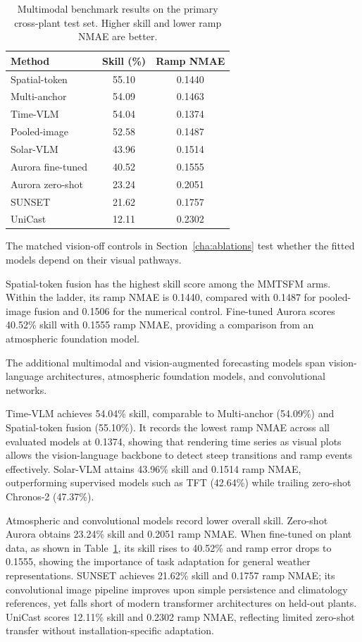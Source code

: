 \begin{table}[htbp]\centering
\begin{tabular}{lcc}\hline
Method & Skill (\%) & Ramp NMAE \\\hline
Spatial-token & 55.10 & 0.1440 \\
Multi-anchor & 54.09 & 0.1463 \\
Time-VLM~\cite{timevlm} & 54.04 & 0.1374 \\
Pooled-image & 52.58 & 0.1487 \\
Solar-VLM~\cite{solarvlm} & 43.96 & 0.1514 \\
Aurora fine-tuned~\cite{aurora} & 40.52 & 0.1555 \\
Aurora zero-shot~\cite{aurora} & 23.24 & 0.2051 \\
SUNSET~\cite{sunset} & 21.62 & 0.1757 \\
UniCast~\cite{unicast} & 12.11 & 0.2302 \\\hline
\end{tabular}
\caption{Multimodal benchmark results on the primary cross-plant test set. Higher skill and lower ramp NMAE are better.}\label{tab:results-multimodal}
\end{table}

The matched vision-off controls in Section~\ref{cha:ablations} test whether the fitted models depend on their visual pathways.

Spatial-token fusion has the highest skill score among the MMTSFM arms. Within the ladder, its ramp NMAE is 0.1440, compared with 0.1487 for pooled-image fusion and 0.1506 for the numerical control. Fine-tuned Aurora scores 40.52\% skill with 0.1555 ramp NMAE, providing a comparison from an atmospheric foundation model.

The additional multimodal and vision-augmented forecasting models span vision-language architectures, atmospheric foundation models, and convolutional networks.

Time-VLM achieves 54.04\% skill, comparable to Multi-anchor (54.09\%) and Spatial-token fusion (55.10\%). It records the lowest ramp NMAE across all evaluated models at 0.1374, showing that rendering time series as visual plots allows the vision-language backbone to detect steep transitions and ramp events effectively. Solar-VLM attains 43.96\% skill and 0.1514 ramp NMAE, outperforming supervised models such as TFT (42.64\%) while trailing zero-shot Chronos-2 (47.37\%).

Atmospheric and convolutional models record lower overall skill. Zero-shot Aurora obtains 23.24\% skill and 0.2051 ramp NMAE. When fine-tuned on plant data, as shown in Table~\ref{tab:results-multimodal}, its skill rises to 40.52\% and ramp error drops to 0.1555, showing the importance of task adaptation for general weather representations. SUNSET achieves 21.62\% skill and 0.1757 ramp NMAE; its convolutional image pipeline improves upon simple persistence and climatology references, yet falls short of modern transformer architectures on held-out plants. UniCast scores 12.11\% skill and 0.2302 ramp NMAE, reflecting limited zero-shot transfer without installation-specific adaptation.

